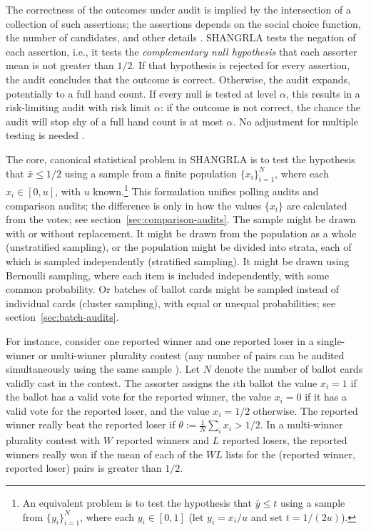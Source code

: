 \documentclass[aoas]{imsart}
\begin{document}
The correctness of the outcomes under audit is implied by the intersection of a collection of such assertions;
the assertions depends on the social choice function, the number of candidates, and other details \citep{stark20}.
SHANGRLA tests the negation of each assertion, i.e., it tests the
\emph{complementary null hypothesis} that each assorter mean is not greater than $1/2$.
If that hypothesis is rejected for every assertion,
the audit concludes that the outcome is correct.
Otherwise, the audit expands, potentially to a full hand count.
If every null is tested at level $\alpha$, this results in a risk-limiting
audit with risk limit $\alpha$: if the outcome is not correct, the chance the audit will stop
shy of a full hand count is at most $\alpha$.
No adjustment for multiple testing is needed \citep{stark20}.

The core, canonical statistical problem in SHANGRLA is to test the hypothesis that $\bar{x} \le 1/2$ using a 
sample from a finite population $\{x_i\}_{i=1}^N$, 
where each $x_i \in [0, u]$, with $u$ known.\footnote{%
An equivalent problem is to test the hypothesis that 
$\bar{y} \le t$ using a sample from $\{y_i\}_{i=1}^N$, where each $y_i \in [0, 1]$ (let $y_i = x_i/u$ and set $t=1/(2u)$).
}
This formulation unifies polling audits and comparison audits; the difference is only in how the 
values $\{x_i\}$ are calculated from the votes; see section~\ref{sec:comparison-audits}.
The sample might be drawn with or without replacement.
It might be drawn from the population as a whole 
(unstratified sampling), or the population might be divided into strata, each of which is sampled independently (stratified sampling).
It might be drawn using Bernoulli sampling, where each item is included independently, with some common probability.
Or batches of ballot cards might be sampled instead of individual cards (cluster sampling),
with equal or unequal probabilities; see section~\ref{sec:batch-audits}.

For instance, consider one reported winner and one reported loser in a single-winner or multi-winner plurality 
contest (any number of pairs can
be audited simultaneously using the same sample \citep{stark20}).
Let $N$ denote the number of ballot cards validly cast in the contest.
The assorter assigns the $i$th ballot the value $x_i=1$ if the ballot has a valid vote for the reported winner, 
the value $x_i=0$ if it has a valid vote for the reported loser, and the value $x_i=1/2$ otherwise.
The reported winner really beat the reported loser if $\theta := \frac{1}{N}\sum_i x_i > 1/2$.
In a multi-winner plurality contest with $W$ reported winners and $L$ reported losers,
the reported winners really won if the mean of each of the $WL$ lists for the (reported winner, reported loser) pairs
is greater than $1/2$.
\end{document}

